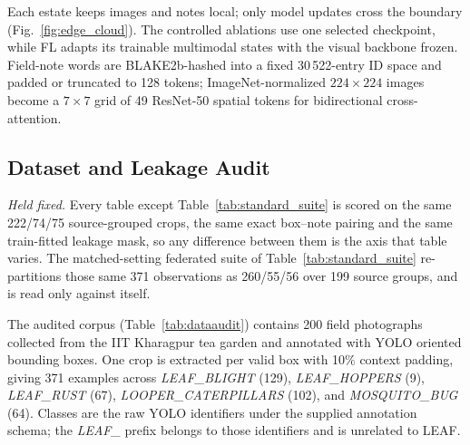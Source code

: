 \documentclass[conference]{IEEEtran}
\begin{document}
Each estate keeps images and notes local; only model updates cross the
boundary (Fig.~\ref{fig:edge_cloud}).
The controlled ablations use one selected checkpoint, while FL adapts its
trainable multimodal states with the visual backbone frozen. Field-note words
are BLAKE2b-hashed into a fixed 30\,522-entry ID space and padded or truncated
to 128 tokens; ImageNet-normalized $224{\times}224$ images become a
$7{\times}7$ grid of 49 ResNet-50 spatial tokens for bidirectional
cross-attention.

\subsection{Dataset and Leakage Audit}
\label{sec:dataset}

\emph{Held fixed.} Every table except Table~\ref{tab:standard_suite} is scored
on the same 222/74/75 source-grouped crops, the same exact box--note pairing and
the same train-fitted leakage mask, so any difference between them is the axis
that table varies. The matched-setting
federated suite of Table~\ref{tab:standard_suite} re-partitions those same 371
observations as 260/55/56 over 199 source groups, and is read only against itself.

The audited corpus (Table~\ref{tab:dataaudit}) contains 200 field
photographs collected from the IIT
Kharagpur tea garden and annotated with YOLO oriented bounding boxes. One crop
is extracted per valid box with 10\% context padding,
giving 371 examples across \textit{LEAF\_BLIGHT} (129),
\textit{LEAF\_HOPPERS} (9), \textit{LEAF\_RUST} (67),
\textit{LOOPER\_CATERPILLARS} (102), and \textit{MOSQUITO\_BUG} (64).
Classes are the raw YOLO identifiers under the supplied annotation schema; the \textit{LEAF\_} prefix belongs to those identifiers and is unrelated to LEAF.
\end{document}
